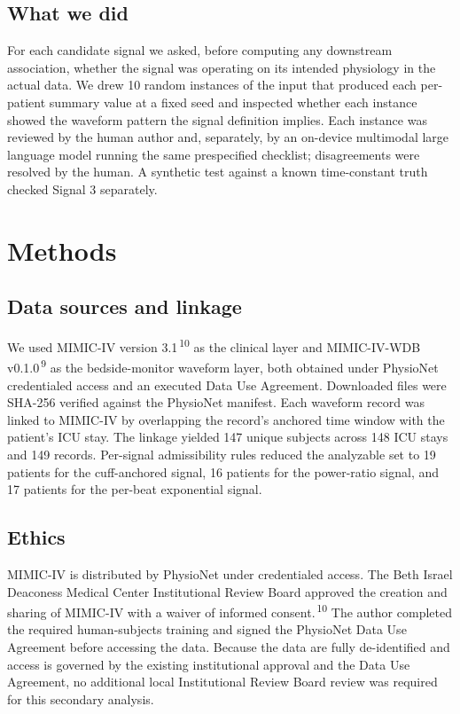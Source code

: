 \documentclass[twocolumn,letterpaper,10pt]{article}
\renewcommand{\cite}[1]{\textsuperscript{\,#1}}
\begin{document}
\subsection{What we did}

For each candidate signal we asked, before computing any downstream association, whether the signal was operating on its intended physiology in the actual data. We drew 10 random instances of the input that produced each per-patient summary value at a fixed seed and inspected whether each instance showed the waveform pattern the signal definition implies. Each instance was reviewed by the human author and, separately, by an on-device multimodal large language model running the same prespecified checklist; disagreements were resolved by the human. A synthetic test against a known time-constant truth checked Signal 3 separately.

\section{Methods}

\subsection{Data sources and linkage}

We used MIMIC-IV version 3.1\cite{10} as the clinical layer and MIMIC-IV-WDB v0.1.0\cite{9} as the bedside-monitor waveform layer, both obtained under PhysioNet credentialed access and an executed Data Use Agreement. Downloaded files were SHA-256 verified against the PhysioNet manifest. Each waveform record was linked to MIMIC-IV by overlapping the record's anchored time window with the patient's ICU stay. The linkage yielded 147 unique subjects across 148 ICU stays and 149 records. Per-signal admissibility rules reduced the analyzable set to 19 patients for the cuff-anchored signal, 16 patients for the power-ratio signal, and 17 patients for the per-beat exponential signal.

\subsection{Ethics}

MIMIC-IV is distributed by PhysioNet under credentialed access. The Beth Israel Deaconess Medical Center Institutional Review Board approved the creation and sharing of MIMIC-IV with a waiver of informed consent.\cite{10} The author completed the required human-subjects training and signed the PhysioNet Data Use Agreement before accessing the data. Because the data are fully de-identified and access is governed by the existing institutional approval and the Data Use Agreement, no additional local Institutional Review Board review was required for this secondary analysis.
\end{document}
